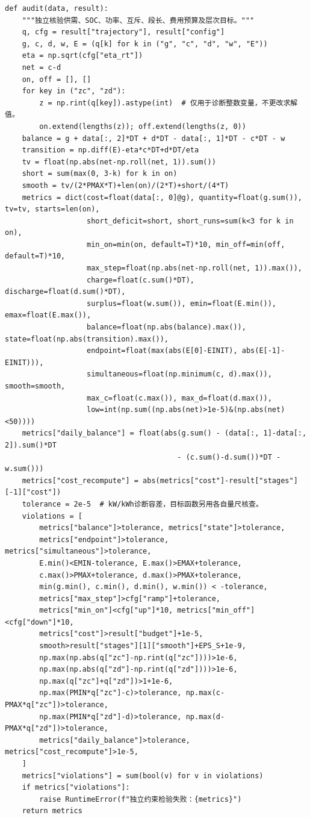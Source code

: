 \documentclass[withoutpreface,bwprint]{cumcmthesis}
\begin{document}
\begin{appendices}
\begin{lstlisting}
def audit(data, result):
    """独立核验供需、SOC、功率、互斥、段长、费用预算及层次目标。"""
    q, cfg = result["trajectory"], result["config"]
    g, c, d, w, E = (q[k] for k in ("g", "c", "d", "w", "E"))
    eta = np.sqrt(cfg["eta_rt"])
    net = c-d
    on, off = [], []
    for key in ("zc", "zd"):
        z = np.rint(q[key]).astype(int)  # 仅用于诊断整数变量，不更改求解值。
        on.extend(lengths(z)); off.extend(lengths(z, 0))
    balance = g + data[:, 2]*DT + d*DT - data[:, 1]*DT - c*DT - w
    transition = np.diff(E)-eta*c*DT+d*DT/eta
    tv = float(np.abs(net-np.roll(net, 1)).sum())
    short = sum(max(0, 3-k) for k in on)
    smooth = tv/(2*PMAX*T)+len(on)/(2*T)+short/(4*T)
    metrics = dict(cost=float(data[:, 0]@g), quantity=float(g.sum()), tv=tv, starts=len(on),
                   short_deficit=short, short_runs=sum(k<3 for k in on),
                   min_on=min(on, default=T)*10, min_off=min(off, default=T)*10,
                   max_step=float(np.abs(net-np.roll(net, 1)).max()),
                   charge=float(c.sum()*DT), discharge=float(d.sum()*DT),
                   surplus=float(w.sum()), emin=float(E.min()), emax=float(E.max()),
                   balance=float(np.abs(balance).max()), state=float(np.abs(transition).max()),
                   endpoint=float(max(abs(E[0]-EINIT), abs(E[-1]-EINIT))),
                   simultaneous=float(np.minimum(c, d).max()), smooth=smooth,
                   max_c=float(c.max()), max_d=float(d.max()),
                   low=int(np.sum((np.abs(net)>1e-5)&(np.abs(net)<50))))
    metrics["daily_balance"] = float(abs(g.sum() - (data[:, 1]-data[:, 2]).sum()*DT
                                        - (c.sum()-d.sum())*DT - w.sum()))
    metrics["cost_recompute"] = abs(metrics["cost"]-result["stages"][-1]["cost"])
    tolerance = 2e-5  # kW/kWh诊断容差，目标函数另用各自量尺核查。
    violations = [
        metrics["balance"]>tolerance, metrics["state"]>tolerance,
        metrics["endpoint"]>tolerance, metrics["simultaneous"]>tolerance,
        E.min()<EMIN-tolerance, E.max()>EMAX+tolerance,
        c.max()>PMAX+tolerance, d.max()>PMAX+tolerance,
        min(g.min(), c.min(), d.min(), w.min()) < -tolerance,
        metrics["max_step"]>cfg["ramp"]+tolerance,
        metrics["min_on"]<cfg["up"]*10, metrics["min_off"]<cfg["down"]*10,
        metrics["cost"]>result["budget"]+1e-5,
        smooth>result["stages"][1]["smooth"]+EPS_S+1e-9,
        np.max(np.abs(q["zc"]-np.rint(q["zc"])))>1e-6,
        np.max(np.abs(q["zd"]-np.rint(q["zd"])))>1e-6,
        np.max(q["zc"]+q["zd"])>1+1e-6,
        np.max(PMIN*q["zc"]-c)>tolerance, np.max(c-PMAX*q["zc"])>tolerance,
        np.max(PMIN*q["zd"]-d)>tolerance, np.max(d-PMAX*q["zd"])>tolerance,
        metrics["daily_balance"]>tolerance, metrics["cost_recompute"]>1e-5,
    ]
    metrics["violations"] = sum(bool(v) for v in violations)
    if metrics["violations"]:
        raise RuntimeError(f"独立约束检验失败：{metrics}")
    return metrics



\end{lstlisting}
\end{appendices}
\end{document}
